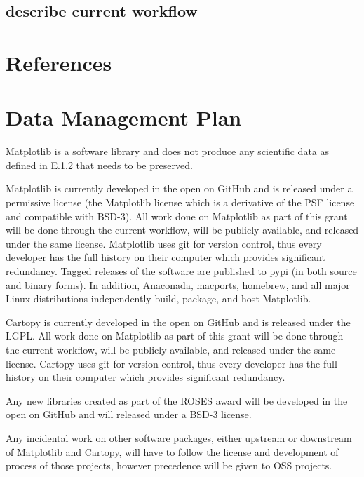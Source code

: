 \documentclass[12pt]{article}
\numberwithin{page}{section}
\begin{document}
\subsection{describe current workflow}

\newpage
\section{References}
\setcounter{page}{1}


\newpage
\section{Data Management Plan}
\setcounter{page}{1}

Matplotlib is a software library and does not produce any scientific
data as defined in E.1.2 that needs to be preserved.

Matplotlib is currently developed in the open on GitHub and is
released under a permissive license (the Matplotlib license which is a
derivative of the PSF license and compatible with BSD-3).  All work
done on Matplotlib as part of this grant will be done through the
current workflow, will be publicly available, and released under the
same license.  Matplotlib uses git for version control, thus every
developer has the full history on their computer which provides
significant redundancy.  Tagged releases of the software are published
to pypi (in both source and binary forms).  In addition, Anaconada,
macports, homebrew, and all major Linux distributions independently
build, package, and host Matplotlib.

Cartopy is currently developed in the open on GitHub and is released
under the LGPL.  All work done on Matplotlib as part of this grant
will be done through the current workflow, will be publicly available,
and released under the same license. Cartopy uses git for version
control, thus every developer has the full history on their computer
which provides significant redundancy.



Any new libraries created as part of the ROSES award will be developed
in the open on GitHub and will released under a BSD-3 license.


Any incidental work on other software packages, either upstream or
downstream of Matplotlib and Cartopy, will have to follow the license
and development of process of those projects, however precedence will
be given to OSS projects.
\end{document}
